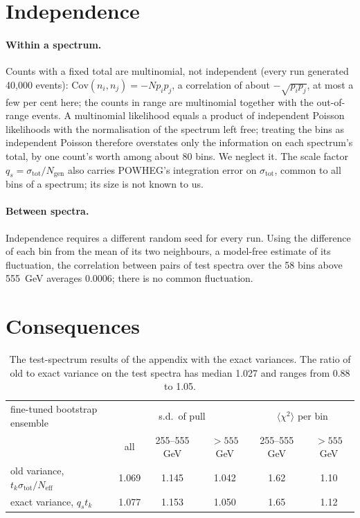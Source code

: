 \section{Independence}

\paragraph{Within a spectrum.} Counts with a fixed total are multinomial, not independent (every run generated 40,000 events):
$\mathrm{Cov}(n_i, n_j) = -N p_i p_j$, a correlation of about $-\sqrt{p_ip_j}$, at most a
few per cent here; the counts in range are multinomial together with the out-of-range
events. A multinomial likelihood equals a
product of independent Poisson likelihoods with the normalisation of the spectrum left
free; treating the bins as independent Poisson therefore overstates only the information
on each spectrum's total, by one count's worth among about 80 bins. We neglect it. The
scale factor $q_s = \sigma_\text{tot}/N_\text{gen}$ also carries POWHEG's integration error
on $\sigma_\text{tot}$, common to all bins of a spectrum; its size is not known to us.

\paragraph{Between spectra.} Independence requires a different random seed for every
run. Using the difference of each bin from the mean of its two neighbours, a model-free
estimate of its fluctuation, the correlation between pairs of test spectra over the 58
bins above 555~GeV averages $0.0006$; there is no common fluctuation.

\section{Consequences}

\begin{table}[h]
\centering
\small
\begin{tabular}{lccccc}
\toprule
fine-tuned bootstrap ensemble & \multicolumn{3}{c}{s.d.\ of pull} & \multicolumn{2}{c}{$\langle\chi^2\rangle$ per bin} \\
 & all & 255--555 GeV & $>555$ GeV & 255--555 GeV & $>555$ GeV \\
\midrule
old variance, $t_k\sigma_\text{tot}/N_\text{eff}$ & 1.069 & 1.145 & 1.042 & 1.62 & 1.10 \\
exact variance, $q_s t_k$ & 1.077 & 1.153 & 1.050 & 1.65 & 1.12 \\
\bottomrule
\end{tabular}
\caption{The test-spectrum results of the appendix with the exact variances. The ratio
of old to exact variance on the test spectra has median 1.027 and ranges from 0.88 to
1.05.}
\end{table}

